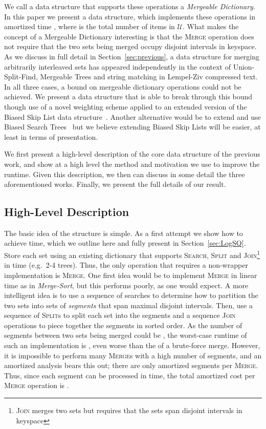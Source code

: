 \documentclass[11pt]{article}
\newcommand{\Ds}{Mergeable Dictionary}
\newcommand{\kwSpl}{Split}
\newcommand{\kwJoinadj}{Join}
\newcommand{\kwUnion}{Merge}
\newcommand{\kwSrc}{Search}
\newcommand{\Spl}{\mbox{\textsc{\kwSpl}}}
\newcommand{\Joinadj}{\mbox{\textsc{\kwJoinadj}}}
\newcommand{\Union}{\mbox{\textsc{\kwUnion{}}}}
\newcommand{\Src}{\mbox{\textsc{\kwSrc}}}
\newcommand{\opcount}{4}
\newcommand{\segments}{{\segment}s}
\newcommand{\segment}{segment}
\newcommand{\universe}{\ensuremath{\mathcal U}}
\newcommand{\hide}[1]{}
\newcounter{count}
\begin{document}
We call a data structure that supports these\hide{ \opcount{}} operations a \emph{\Ds{}}. In this paper we present a data structure, which implements these operations in amortized time , where  is the total number of items in \universe{}. What makes the concept of a \Ds{} interesting is that the \Union{} operation does not require that the two sets being merged occupy disjoint intervals in keyspace. As we discuss in full detail in Section~\ref{sec:previous}, a data structure for merging arbitrarily interleaved sets has appeared independently in the context of Union-Split-Find, Mergeable Trees and string matching in Lempel-Ziv compressed text. In all three cases, a  bound on mergeable dictionary operations could not be achieved. We present a data structure that is able to break through this bound though use of a novel weighting scheme applied to an extended version of the Biased Skip List data structure~\cite{journals/algorithmica/BagchiBG05}. Another alternative would be to extend and use Biased Search Trees~\cite{journals/siamcomp/BentST85} but we believe extending Biased Skip Lists will be easier, at least in terms of presentation.

We first present a high-level description of the core data structure of the previous work, and show at a high level the method and motivation we use to improve the runtime. Given this description, we then can discuss in some detail the three aforementioned works. Finally, we present the full details of our result. 


\subsection{High-Level Description} 

The basic idea of the structure is simple. As a first attempt we show how to achieve  time, which we outline here and fully present in Section~\ref{sec:LogSQ}. Store each set using an existing dictionary that supports \Src{}, \Spl{} and \Joinadj{}\footnote{\Joinadj{} merges two sets but requires that the sets span disjoint intervals in keyspace} in  time (e.g.~2-4 trees). Thus, the only operation that requires a non-wrapper implementation is \Union{}. One first idea would be to implement \Union{} in linear time as in \emph{Merge-Sort}, but this performs poorly, as one would expect. A more intelligent idea is to use a sequence of searches to determine how to partition the two sets into sets of \emph{\segments{}} that span maximal disjoint intervals. Then, use a sequence of \Spl{}s to split each set into the \segments{} and a sequence  \Joinadj{} operations to piece together the \segments{} in sorted order. As the number of \segments{} between two sets being merged could be , the worst-case runtime of such an implementation is , even worse than the  of a brute-force merge. However, it is impossible to perform many \Union{}s with a high number of \segments{}, and an amortized analysis bears this out; there are only  amortized \segments{} per \Union{}. Thus, since each \segment{} can be processed in  time, the total amortized cost per \Union{} operation is . 
\end{document}
